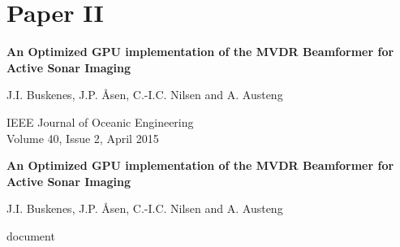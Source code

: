 
\cleardoublepage
\chapter{Paper II}
\mbox{}\hfill\parbox{.9\linewidth}{\setlength\parskip{\baselineskip}

{\renewcommand\baselinestretch{1.1}
\Large\bf An Optimized GPU implementation of the MVDR Beamformer for Active Sonar Imaging}

J.I. Buskenes, J.P. Åsen, C.-I.C. Nilsen and A. Austeng

IEEE Journal of Oceanic Engineering\\
Volume 40, Issue 2, April 2015
}

\newpage
\pagestyle{empty}

\cleardoublepage
\pagestyle{fancy}
\thispagestyle{plain}

\begin{center}
{\Large\bf An Optimized GPU implementation of the MVDR Beamformer for Active Sonar Imaging}
	
J.I. Buskenes, J.P. Åsen, C.-I.C. Nilsen and A. Austeng
\end{center}


{document}